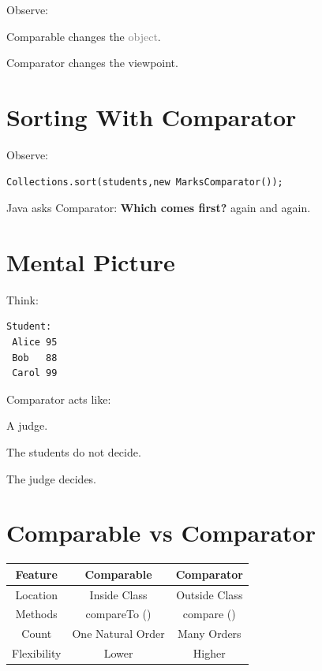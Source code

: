 \documentclass[11pt,a4paper]{book}
\begin{document}
Observe:

\textcolor{RosettaJade}{Comparable}
changes the \textcolor{gray}{object}.

\textcolor{RosettaJade}{Comparator}
changes the \textcolor{RosettaRoyalPurple}{viewpoint}.

\section{Sorting With Comparator}

Observe:

\begin{verbatim} 
Collections.sort(students,new MarksComparator());
\end{verbatim}


Java asks \textcolor{RosettaJade}{Comparator}:
\textbf{Which comes first?}
again and again.

\section{Mental Picture}

Think:

\begin{verbatim}
Student:
 Alice 95
 Bob   88
 Carol 99
\end{verbatim}

Comparator acts like:

A judge.

The students do not decide.

The judge decides.

\section{Comparable vs Comparator}

\begin{center}

\begin{tabular}{|c|c|c|}
\hline
\textbf{Feature} &
\textbf{\textcolor{RosettaJade}{Comparable}} &
\textbf{\textcolor{RosettaJade}{Comparator}} \\
\hline

Location &
Inside Class &
Outside Class \\
\hline

Methods &
compareTo () &
compare () \\
\hline

Count &
One Natural Order &
Many Orders \\
\hline

Flexibility &
Lower &
Higher \\
\hline

\end{tabular}

\end{center}
\end{document}

